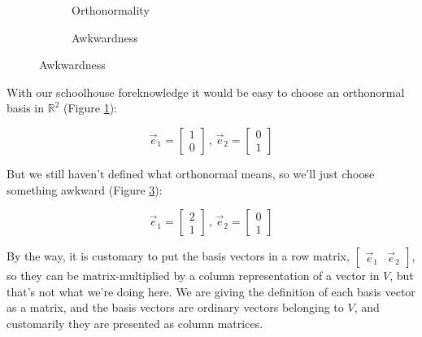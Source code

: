 \begin{figure}[h]
    \caption{Basis vectors in $\mathbb{R}^2$}
    \begin{subfigure}{0.5\textwidth}
        \centering
        \caption{Orthonormality} \label{fig:vectors-orthonormality}
    \end{subfigure}
    \begin{subfigure}{0.5\textwidth}
        \centering
        \caption{Awkwardness} \label{fig:vectors-awkwardness}
    \end{subfigure}
\end{figure}

With our schoolhouse foreknowledge it would be easy to choose an orthonormal basis in $\mathbb{R}^2$ (Figure \ref{fig:vectors-orthonormality}):

$$
\vec{e}_1 = \begin{bmatrix}1 \\ 0\end{bmatrix}\,,\,
\vec{e}_2 = \begin{bmatrix}0 \\ 1\end{bmatrix}
$$

But we still haven't defined what orthonormal means, so we'll just choose something awkward (Figure \ref{fig:vectors-awkwardness}):

$$
\vec{e}_1 = \begin{bmatrix}2 \\ 1\end{bmatrix}\,,\,
\vec{e}_2 = \begin{bmatrix}0 \\ 1\end{bmatrix}
$$

By the way, it is customary to put the basis vectors in a row matrix, $\begin{bmatrix}\vec{e}_1 & \vec{e}_2\end{bmatrix}$, so they can be matrix-multiplied by a column representation of a vector in $V$, but that's not what we're doing here. We are giving the definition of each basis vector as a matrix, and the basis vectors are ordinary vectors belonging to $V$, and customarily they are presented as column matrices.

